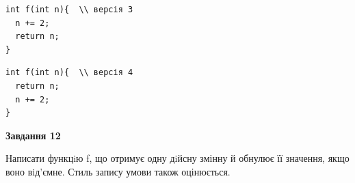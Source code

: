 \documentclass[12pt, ukrainian]{article}
\begin{document}
{\begin {large}
\begin{minipage}[t]{11.0cm}
\vspace{-8mm}\begin{verbatim}
int f(int n){  \\ версія 3
  n += 2;
  return n;
}
\end{verbatim}

\vspace{-8mm}\begin{verbatim}
int f(int n){  \\ версія 4
  return n;
  n += 2;
}
\end{verbatim}



\begin{center}
\textbf{Завдання 12}
\end{center}

Написати функцiю f, що отримує одну дiйсну змінну й обнулює її значення, якщо воно вiд'ємне. Стиль запису умови також оцінюється.\par

\end{minipage}

\end {large}}
\newpage
\end{document}

